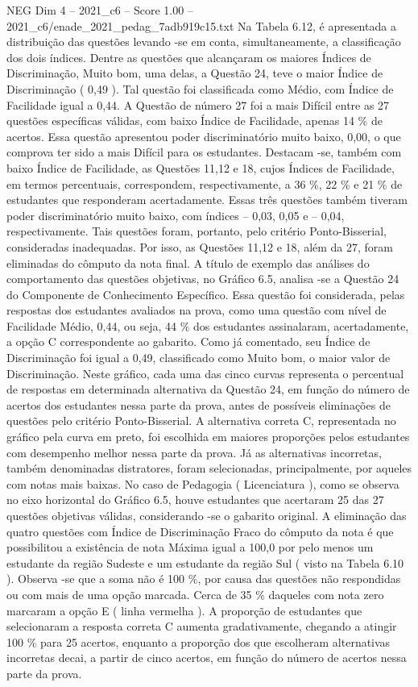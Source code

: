 \begin{textsample}{NEG Dim 4 – 2021\_c6 – Score 1.00 – 2021\_c6/enade\_2021\_pedag\_7adb919c15.txt}
Na Tabela 6.12, é apresentada a distribuição das questões levando -se em conta, simultaneamente, a classificação dos dois índices.
Dentre as questões que alcançaram os maiores Índices de Discriminação, Muito bom, uma delas, a Questão 24, teve o maior Índice de Discriminação ( 0,49 ).
Tal questão foi classificada como Médio, com Índice de Facilidade igual a 0,44.
A Questão de número 27 foi a mais Difícil entre as 27 questões específicas válidas, com baixo Índice de Facilidade, apenas 14 \% de acertos.
Essa questão apresentou poder discriminatório muito baixo, 0,00, o que comprova ter sido a mais Difícil para os estudantes.
Destacam -se, também com baixo Índice de Facilidade, as Questões 11,12 e 18, cujos Índices de Facilidade, em termos percentuais, correspondem, respectivamente, a 36 \%, 22 \% e 21 \% de estudantes que responderam acertadamente.
Essas três questões também tiveram poder discriminatório muito baixo, com índices – 0,03, 0,05 e – 0,04, respectivamente.
Tais questões foram, portanto, pelo critério Ponto-Bisserial, consideradas inadequadas.
Por isso, as Questões 11,12 e 18, além da 27, foram eliminadas do cômputo da nota final.
A título de exemplo das análises do comportamento das questões objetivas, no Gráfico 6.5, analisa -se a Questão 24 do Componente de Conhecimento Específico.
Essa questão foi considerada, pelas respostas dos estudantes avaliados na prova, como uma questão com nível de Facilidade Médio, 0,44, ou seja, 44 \% dos estudantes assinalaram, acertadamente, a opção C correspondente ao gabarito.
Como já comentado, seu Índice de Discriminação foi igual a 0,49, classificado como Muito bom, o maior valor de Discriminação.
Neste gráfico, cada uma das cinco curvas representa o percentual de respostas em determinada alternativa da Questão 24, em função do número de acertos dos estudantes nessa parte da prova, antes de possíveis eliminações de questões pelo critério Ponto-Bisserial.
A alternativa correta C, representada no gráfico pela curva em preto, foi escolhida em maiores proporções pelos estudantes com desempenho melhor nessa parte da prova.
Já as alternativas incorretas, também denominadas distratores, foram selecionadas, principalmente, por aqueles com notas mais baixas.
No caso de Pedagogia ( Licenciatura ), como se observa no eixo horizontal do Gráfico 6.5, houve estudantes que acertaram 25 das 27 questões objetivas válidas, considerando -se o gabarito original.
A eliminação das quatro questões com Índice de Discriminação Fraco do cômputo da nota é que possibilitou a existência de nota Máxima igual a 100,0 por pelo menos um estudante da região Sudeste e um estudante da região Sul ( visto na Tabela 6.10 ).
Observa -se que a soma não é 100 \%, por causa das questões não respondidas ou com mais de uma opção marcada.
Cerca de 35 \% daqueles com nota zero marcaram a opção E ( linha vermelha ).
A proporção de estudantes que selecionaram a resposta correta C aumenta gradativamente, chegando a atingir 100 \% para 25 acertos, enquanto a proporção dos que escolheram alternativas incorretas decai, a partir de cinco acertos, em função do número de acertos nessa parte da prova.

\end{textsample}
